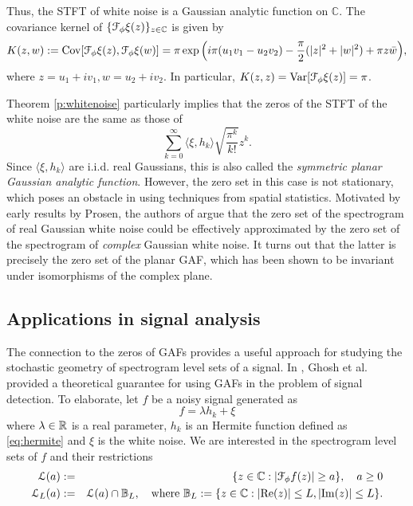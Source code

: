 Thus, the STFT of white noise is a Gaussian analytic function on $\mathbb C$. The covariance kernel of $\{\mathcal{F}_\phi \xi (z)\}_{z\in \mathbb{C}}$ is given by
\begin{equation}
    K(z,w) := \mathrm{Cov}[\mathcal{F}_\phi \xi(z) , \mathcal{F}_\phi \xi(w)] = \pi \exp\Big ( i\pi(u_1v_1 - u_2v_2) - \frac{\pi}{2}(|z|^2 + |w|^2) + \pi z\bar w \Big ),
\end{equation}
where $z= u_1 + i v_1, w = u_2 + i v_2$. In particular,
    $K(z,z) = {\mathop{\mathrm{Var}}\nolimits}[\mathcal{F}_\phi \xi (z)] = \pi$.

Theorem \ref{p:whitenoise} particularly implies that the zeros of the STFT of the white noise are the same as those of 
\[ \sum_{k=0}^\infty \langle \xi, h_k \rangle  \sqrt{\frac{\pi^k}{k!}} z^k.\]
Since $\langle \xi, h_k \rangle$ are i.i.d. real Gaussians, this is also called the \emph{symmetric planar Gaussian analytic function}. However, the zero set in this case is not stationary, which poses an obstacle in using techniques from spatial statistics. Motivated by early results by Prosen, the authors of \cite{BARDENET_Spec} argue that the zero set of the spectrogram of real Gaussian white noise could be effectively approximated by the zero set of the spectrogram of \emph{complex} Gaussian white noise. It turns out that the latter is precisely the zero set of the planar GAF, which has been shown to be invariant under isomorphisms of the complex plane.

\subsection{Applications in signal analysis}
The connection to the zeros of GAFs provides a useful approach for studying the stochastic geometry of spectrogram level sets of a signal. In \cite{GhoshGAF}, Ghosh et al. provided a theoretical guarantee for using GAFs in the problem of signal detection. To elaborate,
let $f$ be a noisy signal generated as
\begin{equation}\label{eq:signal}
     f = \lambda h_k + \xi
\end{equation}
where $\lambda \in \mathbb{R}$ is a real parameter, $h_k$ is an Hermite function defined as \eqref{eq:hermite} and $\xi$ is the white noise. We are interested in the spectrogram level sets of $f$ and their restrictions
\begin{eqnarray} \label{eq:spectrogram}
    \mathcal L(a) &:=& \{z\in \mathbb{C}: |\mathcal{F}_\phi f(z)| \ge a \}, \quad a\ge 0 \\
    \mathcal L_L(a) &:=& \mathcal L(a) \cap \mathbb{B}_L, \quad \text{where } \mathbb{B}_L:=\{z\in \mathbb{C}: |\mathrm{Re}(z)|\le L, |\mathrm{Im}(z)|\le L\}.
\end{eqnarray}

